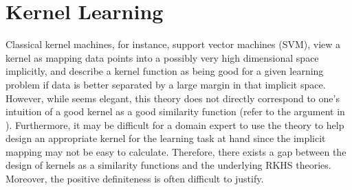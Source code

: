 \section{Kernel Learning}

Classical kernel machines, for instance, support vector machines (SVM), view a kernel as mapping data points into a possibly very high dimensional space implicitly, and describe a kernel function as being good for a given learning problem if data is better separated by a large margin in that implicit space. However, while seems elegant, this theory does not directly correspond to one's intuition of a good kernel as a good similarity function (refer to the argument in \cite{stoc/BalcanBV08}). Furthermore, it may be difficult for a domain expert to use the theory to help design an appropriate kernel for the learning task at hand since the implicit mapping may not be easy to calculate. Therefore, there exists a gap between the design of kernels as a similarity functions and the underlying RKHS theories. Moreover, the positive definiteness is often difficult to justify.

